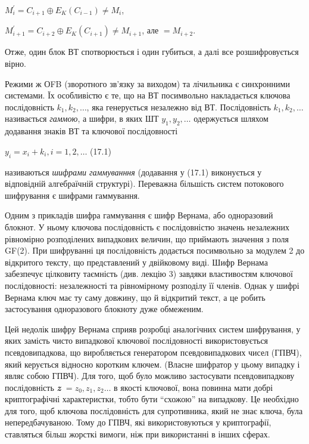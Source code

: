 {\centering
 ${M_{{i}}^{{'}}=C_{{i+1}}{\oplus}E_{{K}}(C_{{i-1}})\neq M_{{i}}}$,
\par}

{\centering
 ${M_{{i+1}}^{{'}}=C_{{i+2}}{\oplus}E_{{K}}(C_{{i+1}})\neq M_{{i+1}}}$, але 
${=M_{{i+2}}}$.
\par}

Отже, один блок ВТ спотворюється і один губиться, а далі все розшифровується
вірно.

Режими ж ОFB (зворотного зв’язку за виходом) та  лічильника є синхронними
системами. Їх особливістю є те, що на ВТ посимвольно накладається ключова
послідовність  ${k_{{1}},k_{{2}},\dots}$, яка генерується
незалежно від ВТ. Послідовність  ${k_{{1}},k_{{2}},\dots}$
називається \textit{гаммою}, а шифри, в яких ШТ 
${y_{{1}},y_{{2}},\dots}$ одержується шляхом додавання
знаків ВТ та ключової послідовності 

{\raggedleft
 ${y_{{i}}=x_{{i}}+k_{{i}},i=1,2,\dots}$  (17.1)
\par}

називаються \textit{шифрами гаммуванння}\textbf{ }(додавання у\textbf{ }(17.1)
виконується у відповідній алгебраїчній структурі). Переважна більшість систем
потокового шифрування є шифрами гаммування.

Одним з прикладів шифра гаммування  є шифр Вернама, або одноразовий блокнот. У
ньому ключова послідовність є послідовністю значень незалежних рівномірно
розподілених випадкових величин, що приймають значення з поля GF(2). При
шифруванні ця послідовність додається посимвольно за модулем 2  до відкритого
тексту, що представлений у двійковому виді. Шифр Вернама забезпечує цілковиту
таємність (див. лекцію 3) завдяки властивостям ключової послідовності:
незалежності та рівномірному розподілу її членів. Однак у шифрі Вернама ключ
має ту саму довжину, що й відкритий текст, а це робить застосування
одноразового блокноту дуже обмеженим.

Цей недолік шифру Вернама сприяв розробці аналогічних систем шифрування, у яких
замість чисто випадкової ключової послідовності використовується
псевдовипадкова, що виробляється генератором псевдовипадкових чисел (ГПВЧ),
який керується відносно коротким ключем. (Власне шифратор у цьому випадку і
являє собою ГПВЧ). Для того, щоб було можливо застосувати псевдовипадкову
послідовність \textbf{\textit{z}}
${=z_{{0}},z_{{1}},z_{{2}}\dots}$ в якості ключової, вона
повинна мати добрі криптографічні характеристки, тобто бути “схожою” на
випадкову. Це необхідно для того, щоб ключова послідовність для супротивника,
який не знає ключа, була непередбачуваною. Тому до ГПВЧ, які використовуються у
криптографії, ставляться більш жорсткі вимоги, ніж при використанні в інших
сферах. 

